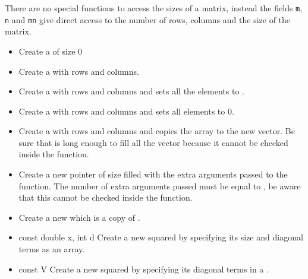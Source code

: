 There are no special functions to access the sizes of a matrix, instead the fields
\verb!m!, \verb!n! and \verb!mn! give direct access to the number of rows, columns
and the size of the matrix.

\begin{itemize}
  \item {}
  \sshortdescribe Create a \PnlMat of size 0

\item {}
  \sshortdescribe Create a \PnlMat  with  rows and  columns.

\item {}
  \sshortdescribe Create a \PnlMat with  rows and 
  columns and sets all the elements to .

\item {}
  \sshortdescribe Create a \PnlMat with  rows and 
  columns and sets all elements to 0.

\item {}
  \sshortdescribe Create a \PnlMat with  rows and 
  columns and copies the array  to the new vector. Be sure that 
  is long enough to fill all the vector because it cannot be checked inside the function.

\item {}
  \sshortdescribe Create a new \PnlMat pointer of size  filled with the extra arguments passed to the function. The
  number of extra arguments passed must be equal to , be
  aware that this cannot be checked inside the function.

\item {}
  \sshortdescribe Create a new \PnlMat which is a copy of .
  
\item {}
  {const double \ptr x, int d}
  \sshortdescribe Create a new squared \PnlMat by specifying its size and
  diagonal terms as an array.

\item {}
  {const \PnlVect \ptr V}
  \sshortdescribe Create a new squared \PnlMat by specifying its diagonal
  terms in a \PnlVect.


\end{itemize}
